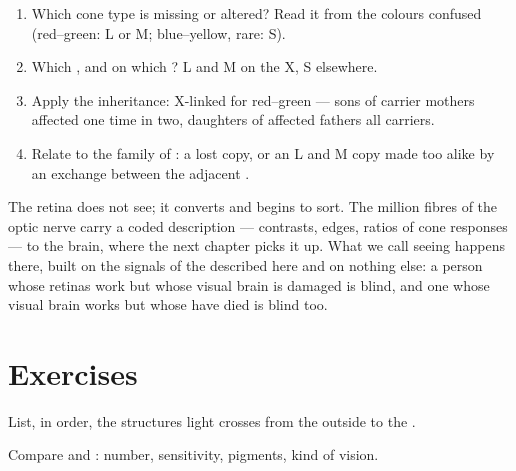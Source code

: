 \begin{method}\label{met:g11:the-eye:case}
\begin{enumerate}
  \item Which cone type is missing or altered? Read it from the
        colours confused (red--green: L or M; blue--yellow, rare: S).
  \item Which , and on which ? L and M on the X, S
        elsewhere.
  \item Apply the inheritance: X-linked  for red--green ---
        sons of carrier mothers affected one time in two, daughters of
        affected fathers all carriers.
  \item Relate to the family of : a lost copy, or an L and M
        copy made too alike by an exchange between the adjacent .
\end{enumerate}
\end{method}

\begin{remark}\label{rem:g11:the-eye:tobrain}
The retina does not see; it converts and begins to sort. The million
fibres of the optic nerve carry a coded description --- contrasts,
edges, ratios of cone responses --- to the brain, where the next
chapter picks it up. What we call seeing happens there, built on the
signals of the  described here and on nothing else: a person
whose retinas work but whose visual brain is damaged is blind, and
one whose visual brain works but whose  have died is
blind too.
\end{remark}

\section{Exercises}

\begin{exercise}[$\star$]\label{exo:g11:the-eye:1}
List, in order, the structures light crosses from the outside to the
.
\end{exercise}

\begin{exercise}[$\star$]\label{exo:g11:the-eye:2}
Compare  and : number, sensitivity, pigments, kind of vision.
\end{exercise}

